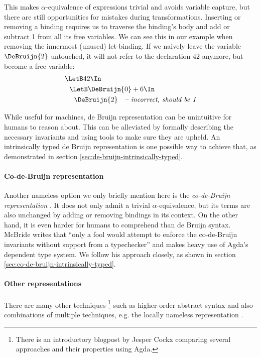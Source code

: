     This makes $\alpha$-equivalence of expressions trivial and avoids variable capture,
    but there are still opportunities for mistakes during transformations.
    Inserting or removing a binding
    requires us to traverse the binding's body and add or subtract 1 from all its free variables.
    We can see this in our example when removing the innermost (unused) let-binding.
    If we naively leave the variable $\DeBruijn{2}$ untouched,
    it will not refer to the declaration $42$ anymore,
    but become a free variable:
    \begin{align*}
      &\LetB 42 \In                   \\
      &\ \ \LetB \DeBruijn{0} + 6 \In \\
      &\ \ \ \ \DeBruijn{2}\ \ \ \textit{-- incorrect, should be 1}
    \end{align*}

    While useful for machines, de Bruijn representation can be unintuitive
    for humans to reason about.
    This can be alleviated by formally describing the necessary invariants
    and using tools to make sure they are upheld.
    An intrinsically typed de Bruijn representation is one
    possible way to achieve that, as demonstrated in section
    \ref{sec:de-bruijn-intrinsically-typed}.

  \paragraph{Co-de-Bruijn representation}
    Another nameless option we only briefly mention here is the
    \emph{co-de-Bruijn representation}
    \cite{McBride2018EveryBodysGotToBeSomewhere}.
    It does not only admit a trivial $\alpha$-equivalence,
    but its terms are also unchanged by adding or removing bindings
    in its context.
    On the other hand,
    it is even harder for humans to comprehend than de Bruijn syntax.
    McBride writes that
    ``only a fool would attempt to enforce the co-de-Bruijn invariants
    without support from a typechecker''
    and makes heavy use of Agda's dependent type system.
    We follow his approach closely, as shown in section
    \ref{sec:co-de-bruijn-intrinsically-typed}.

  \paragraph{Other representations}
    There are many other techniques%
    \footnote{
    There is an introductory blogpost by Jesper Cockx
    \cite{Cockx2021RepresentationsBinding}
    comparing several approaches and their properties using Agda.
    }
    such as higher-order abstract syntax
    \cite{Pfenning1988HOAS}
    and also combinations of multiple techniques, e.g. the locally nameless representation
    \cite{Chargueraud2011LocallyNameless}.
